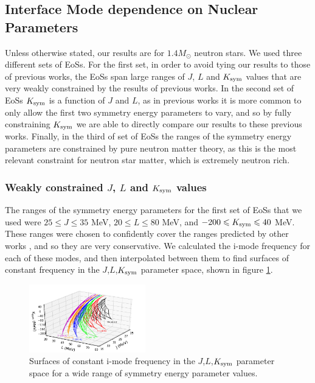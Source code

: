 \documentclass[fleqn,usenatbib]{mnras}
\begin{document}
\subsection{Interface Mode dependence on Nuclear Parameters}
\hspace{\parindent}Unless otherwise stated, our results are for $1.4M_{\odot}$ neutron stars. We used three different sets of EoSs. For the first set, in order to avoid tying our results to those of previous works, the EoSs span large ranges of $J$, $L$ and $K_{\rm sym}$ values that are very weakly constrained by the results of previous works. In the second set of EoSs $K_{\rm sym}$ is a function of $J$ and $L$, as in previous works it is more common to only allow the first two symmetry energy parameters to vary, and so by fully constraining $K_{\rm sym}$ we are able to directly compare our results to these previous works. Finally, in the third of set of EoSs the ranges of the symmetry energy parameters are constrained by pure neutron matter theory, as this is the most relevant constraint for neutron star matter, which is extremely neutron rich.

\subsubsection{Weakly constrained $J$, $L$ and $K_{\rm sym}$ values}
\hspace{\parindent}The ranges of the symmetry energy parameters for the first set of EoSs that we used were $25\leq J\leq 35$ MeV, $20\leq L\leq 80$ MeV, and $-200\leq K_{\rm sym}\leq 40$ MeV. These ranges were chosen to confidently cover the ranges predicted by other works \citep{liu2010nuclear,tsang2012constraints,lattimer2013constraining,balantekin2014nuclear}, and so they are very conservative. We calculated the i-mode frequency for each of these modes, and then interpolated between them to find surfaces of constant frequency in the $J$,$L$,$K_{\rm sym}$ parameter space, shown in figure \ref{fig:grid_J_L_K}. 




\begin{figure}
\centering
\includegraphics[width=0.45\textwidth,angle=0]{grid_J_L_K.png}
\caption{Surfaces of constant i-mode frequency in the $J$,$L$,$K_{\rm sym}$ parameter space for a wide range of symmetry energy parameter values.}
\label{fig:grid_J_L_K}
\end{figure}
\end{document}
